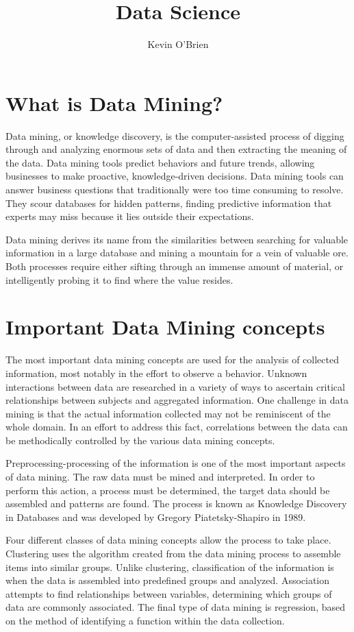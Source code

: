 \documentclass[12pt]{article}
\title{Data Science}
\author{Kevin O'Brien}
\begin{document}
\section{What is Data Mining?}
Data mining, or knowledge discovery, is the computer-assisted process of digging through and analyzing enormous sets of data and then extracting the meaning of the data. Data mining tools predict behaviors and future trends, allowing businesses to make proactive, knowledge-driven decisions. Data mining tools can answer business questions that traditionally were too time consuming to resolve. They scour databases for hidden patterns, finding predictive information that experts may miss because it lies outside their expectations.

Data mining derives its name from the similarities between searching for valuable information in a large database and mining a mountain for a vein of valuable ore. Both processes require either sifting through an immense amount of material, or intelligently probing it to find where the value resides.

\section*{Important Data Mining concepts}

The most important data mining concepts are used for the analysis of collected information, most notably in the effort to observe a behavior. Unknown interactions between data are researched in a variety of ways to ascertain critical relationships between subjects and aggregated information. One challenge in data mining is that the actual information collected may not be reminiscent of the whole domain. In an effort to address this fact, correlations between the data can be methodically controlled by the various data mining concepts.



Preprocessing-processing of the information is one of the most important aspects of data mining. The raw data must be mined and interpreted. In order to perform this action, a process must be determined, the target data should be assembled and patterns are found. The process is known as Knowledge Discovery in Databases and was developed by Gregory Piatetsky-Shapiro in 1989.



Four different classes of data mining concepts allow the process to take place. Clustering uses the algorithm created from the data mining process to assemble items into similar groups. Unlike clustering, classification of the information is when the data is assembled into predefined groups and analyzed. Association attempts to find relationships between variables, determining which groups of data are commonly associated. The final type of data mining is regression, based on the method of identifying a function within the data collection.
\end{document}
